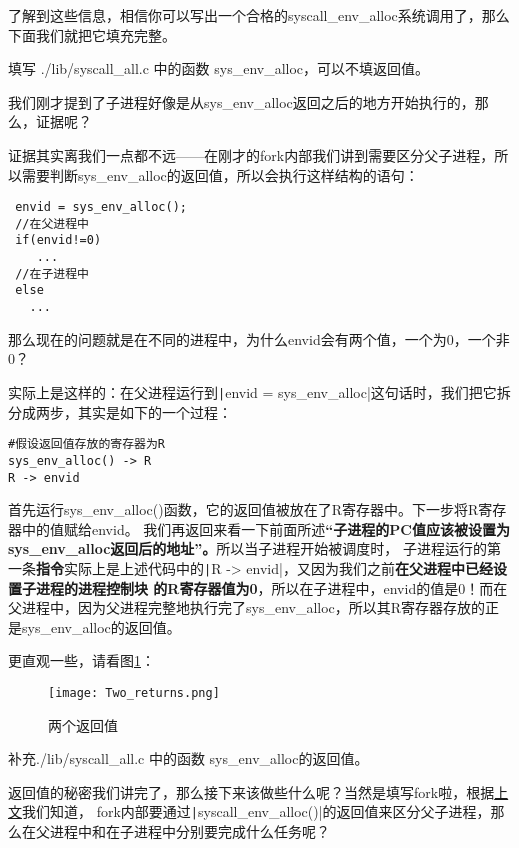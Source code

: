 了解到这些信息，相信你可以写出一个合格的syscall\_env\_alloc系统调用了，那么下面我们就把它填充完整。

\begin{exercise}
填写 ./lib/syscall\_all.c 中的函数 sys\_env\_alloc，可以不填返回值。
\end{exercise}

我们刚才提到了子进程好像是从sys\_env\_alloc返回之后的地方开始执行的，那么，证据呢？

证据其实离我们一点都不远——在刚才的fork内部我们讲到需要区分父子进程，所以需要判断sys\_env\_alloc的返回值，所以会执行这样结构的语句：
\begin{verbatim}
 envid = sys_env_alloc();
 //在父进程中
 if(envid!=0)
    ...
 //在子进程中
 else
   ...
\end{verbatim}

那么现在的问题就是在不同的进程中，为什么envid会有两个值，一个为0，一个非0？

实际上是这样的：在父进程运行到\texttt|envid = sys_env_alloc|这句话时，我们把它拆分成两步，其实是如下的一个过程：
\begin{verbatim}
#假设返回值存放的寄存器为R
sys_env_alloc() -> R
R -> envid
\end{verbatim}

首先运行sys\_env\_alloc()函数，它的返回值被放在了R寄存器中。下一步将R寄存器中的值赋给envid。
我们再返回来看一下前面所述\textbf{“子进程的PC值应该被设置为sys\_env\_alloc返回后的地址”。}所以当子进程开始被调度时，
子进程运行的第一条\textbf{指令}实际上是上述代码中的\texttt|R -> envid|，又因为我们之前\textbf{在父进程中已经设置子进程的进程控制块
的R寄存器值为0}，所以在子进程中，envid的值是0！而在父进程中，因为父进程完整地执行完了sys\_env\_alloc，所以其R寄存器存放的正是sys\_env\_alloc的返回值。

更直观一些，请看图\ref{fig:Two_returns}：

\begin{figure}[htbp]
  \centering
  \texttt{[image: Two\_returns.png]}
  \caption{两个返回值}\label{fig:Two_returns} 
\end{figure}

\begin{exercise}
补充./lib/syscall\_all.c 中的函数 sys\_env\_alloc的返回值。
\end{exercise}

返回值的秘密我们讲完了，那么接下来该做些什么呢？当然是填写fork啦，根据\hyperref[fork区分父子进程]{上文}我们知道，
fork内部要通过\texttt|syscall_env_alloc()|的返回值来区分父子进程，那么在父进程中和在子进程中分别要完成什么任务呢？

